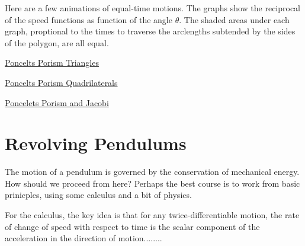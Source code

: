 \documentclass{ximera}
\begin{document}
Here are a few animations of equal-time motions. The graphs show the reciprocal of the speed functions as function of the angle $\theta$. The shaded areas under each graph, proptional to the times to traverse the arclengths subtended by the sides of the polygon, are all equal.

\begin{exploration}

\begin{onlineOnly}
    \begin{center}
\end{center}
\end{onlineOnly}

\href{https://www.desmos.com/calculator/0aihemcv0o}{Poncelts Porism Triangles}

\end{exploration}


\begin{exploration}

\begin{onlineOnly}
    \begin{center}
\end{center}
\end{onlineOnly}

\href{https://www.desmos.com/calculator/pua4ogjcmr}{Poncelts Porism Quadrilaterals}


\end{exploration}


\begin{exploration}
\begin{onlineOnly}
    \begin{center}
\end{center}
\end{onlineOnly}

\href{https://www.desmos.com/calculator/lwbypn9rje}{Poncelets Porism and Jacobi}

\end{exploration}


\section*{Revolving Pendulums}
The motion of a pendulum is governed by the conservation of mechanical energy. How should we proceed from here? Perhaps the best course is to work from basic prinicples, using some calculus and a bit of physics.

For the calculus, the key idea is that for any twice-differentiable motion, the rate of change of speed with respect to time is the scalar component of the acceleration in the direction of motion........
\end{document}
